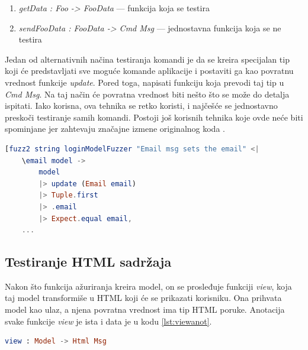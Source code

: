 \documentclass[12pt,oneside]{memoir}
\begin{document}
\begin{enumerate}
\item \emph{getData : Foo -> FooData} --- funkcija koja se testira
\item \emph{sendFooData : FooData -> Cmd Msg} --- jednostavna funkcija koja se ne testira 
\end{enumerate}

\par Jedan od alternativnih načina testiranja komandi je da se kreira specijalan tip koji će predstavljati sve moguće komande aplikacije i postaviti ga kao povratnu vrednost funkcije \emph{update}. Pored toga, napisati funkciju koja prevodi taj tip u \emph{Cmd Msg}. Na taj način će povratna vrednost biti nešto što se može do detalja ispitati. Iako korisna, ova tehnika se retko koristi, i najčešće se jednostavno preskoči testiranje samih komandi. Postoji još korisnih tehnika koje ovde neće biti spominjane jer zahtevaju značajne izmene originalnog koda \cite{cmd1, cmd2}. 

\begin{minipage}{\linewidth}
\begin{lstlisting}[language=elm, basicstyle=\small, caption={Testovi za funkciju \emph{update} modula \emph{LoginPage}},captionpos=b, label={lst:loginupdatetest}]
    [fuzz2 string loginModelFuzzer "Email msg sets the email" <|
    \email model -> 
        model
        |> update (Email email)
        |> Tuple.first 
        |> .email 
        |> Expect.equal email,
    ...
\end{lstlisting}
\end{minipage}

\subsection{Testiranje HTML sadržaja}

\par Nakon što funkcija ažuriranja kreira model, on se prosleđuje funkciji \emph{view}, koja taj model transformiše u HTML koji će se prikazati korisniku. Ona prihvata model kao ulaz, a njena povratna vrednost ima tip HTML poruke. Anotacija svake funkcije \emph{view} je ista i data je u kodu \ref{lst:viewanot}.

\begin{minipage}{\linewidth}
\begin{lstlisting}[language=elm, basicstyle=\small, caption={Anotacija funkcije \emph{view}},captionpos=b, label={lst:viewanot}]
		view : Model -> Html Msg
\end{lstlisting}
\end{minipage}
\end{document}
